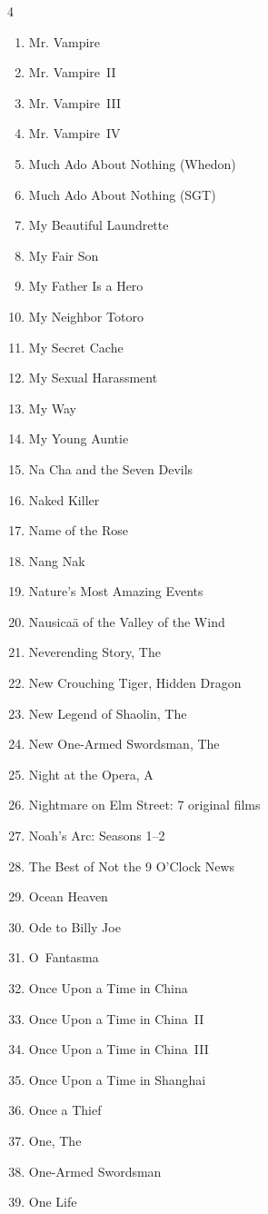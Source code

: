 \documentclass{article}
\begin{document}
\begin{multicols}{4}
\begin{enumerate}
\item Mr. Vampire
\item Mr. Vampire~II
\item Mr. Vampire~III
\item Mr. Vampire~IV
\item Much Ado About Nothing (Whedon)
\item Much Ado About Nothing (SGT)
\item My Beautiful Laundrette
\item My Fair Son
\item My Father Is a Hero
\item My Neighbor Totoro
\item My Secret Cache
\item My Sexual Harassment
\item My Way
\item My Young Auntie
\item Na Cha and the Seven Devils
\item Naked Killer
\item Name of the Rose
\item Nang Nak
\item Nature's Most Amazing Events
\item Nausica\"a of the Valley of the Wind
\item Neverending Story, The
\item New Crouching Tiger, Hidden Dragon
\item New Legend of Shaolin, The
\item New One-Armed Swordsman, The
\item Night at the Opera, A
\item Nightmare on Elm Street: 7 original films
\item Noah's Arc: Seasons 1--2
\item The Best of Not the 9 O'Clock News
\item Ocean Heaven
\item Ode to Billy Joe
\item O~Fantasma
\item Once Upon a Time in China
\item Once Upon a Time in China~II
\item Once Upon a Time in China~III
\item Once Upon a Time in Shanghai
\item Once a Thief
\item One, The
\item One-Armed Swordsman
\item One Life

\end{enumerate}
\end{multicols}
\end{document}
